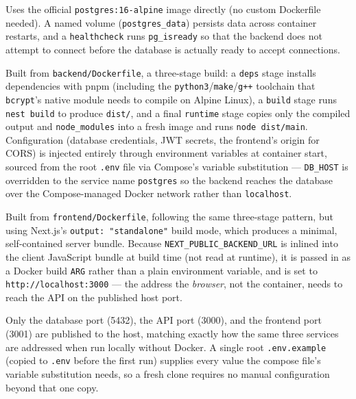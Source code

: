 \documentclass[11pt]{article}
\begin{document}
\begin{description}[style=nextline]
    \item[\texttt{postgres}] Uses the official \texttt{postgres:16-alpine}
    image directly (no custom Dockerfile needed). A named volume
    (\texttt{postgres\_data}) persists data across container restarts,
    and a \texttt{healthcheck} runs \texttt{pg\_isready} so that the
    backend does not attempt to connect before the database is actually
    ready to accept connections.

    \item[\texttt{backend}] Built from \texttt{backend/Dockerfile}, a
    three-stage build: a \texttt{deps} stage installs dependencies with
    pnpm (including the \texttt{python3}/\texttt{make}/\texttt{g++}
    toolchain that \texttt{bcrypt}'s native module needs to compile on
    Alpine Linux), a \texttt{build} stage runs \texttt{nest build} to
    produce \texttt{dist/}, and a final \texttt{runtime} stage copies
    only the compiled output and \texttt{node\_modules} into a fresh
    image and runs \texttt{node dist/main}. Configuration (database
    credentials, JWT secrets, the frontend's origin for CORS) is injected
    entirely through environment variables at container start, sourced
    from the root \texttt{.env} file via Compose's variable
    substitution --- \texttt{DB\_HOST} is overridden to the service name
    \texttt{postgres} so the backend reaches the database over the
    Compose-managed Docker network rather than \texttt{localhost}.

    \item[\texttt{frontend}] Built from \texttt{frontend/Dockerfile},
    following the same three-stage pattern, but using Next.js's
    \texttt{output: "standalone"} build mode, which produces a minimal,
    self-contained server bundle. Because
    \texttt{NEXT\_PUBLIC\_BACKEND\_URL} is inlined into the client
    JavaScript bundle at build time (not read at runtime), it is passed
    in as a Docker build \texttt{ARG} rather than a plain environment
    variable, and is set to \texttt{http://localhost:3000} --- the
    address the \emph{browser}, not the container, needs to reach the
    API on the published host port.
\end{description}

Only the database port (5432), the API port (3000), and the frontend port
(3001) are published to the host, matching exactly how the same three
services are addressed when run locally without Docker. A single root
\texttt{.env.example} (copied to \texttt{.env} before the first run)
supplies every value the compose file's variable substitution needs, so
a fresh clone requires no manual configuration beyond that one copy.
\end{document}
